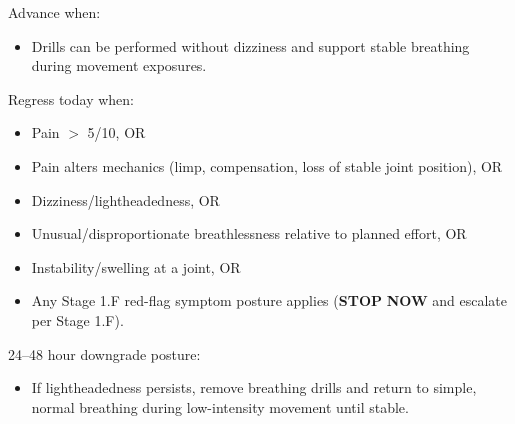 \documentclass[10pt]{article}
\begin{document}
Advance when:

\begin{itemize}
\item Drills can be performed without dizziness and support stable breathing during movement exposures.
\end{itemize}

Regress today when:

\begin{itemize}
\item Pain $>$ 5/10, OR
\item Pain alters mechanics (limp, compensation, loss of stable joint position), OR
\item Dizziness/lightheadedness, OR
\item Unusual/disproportionate breathlessness relative to planned effort, OR
\item Instability/swelling at a joint, OR
\item Any Stage 1.F red-flag symptom posture applies (\textbf{STOP} \textbf{NOW} and escalate per Stage 1.F).
\end{itemize}

24–48 hour downgrade posture:

\begin{itemize}
\item If lightheadedness persists, remove breathing drills and return to simple, normal breathing during low-intensity movement until stable.
\end{itemize}
\end{document}
